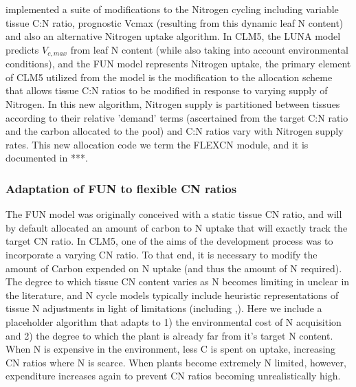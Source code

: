 \documentclass[draft,linenumbers]{agujournal}
\begin{document}
\cite{ghimire2016} implemented a suite of modifications to the Nitrogen cycling including variable tissue C:N ratio, prognostic Vcmax (resulting from this dynamic leaf N content) and also an alternative Nitrogen uptake algorithm. In CLM5, the LUNA model predicts $V_{c,max}$ from leaf N content (while also taking into account environmental conditions), and the FUN model represents Nitrogen uptake, the primary element of CLM5 utilized from the \cite{ghimire2016} model is the modification to the allocation scheme that allows tissue C:N ratios to be modified in response to varying supply of Nitrogen. In this new algorithm, Nitrogen supply is partitioned between tissues according to their relative 'demand' terms (ascertained from the target C:N ratio and the carbon allocated to the pool) and C:N ratios vary with Nitrogen supply rates. This new allocation code we term the FLEXCN module, and it is documented in ***. 

\subsubsection{Adaptation of FUN to flexible CN ratios}
The FUN model was originally conceived with a static tissue CN ratio, and will by default allocated an amount of carbon to N uptake that will exactly track the target CN ratio. In CLM5, one of the aims of the development process was to incorporate a varying CN ratio. To that end, it is necessary to modify the amount of Carbon expended on N uptake (and thus the amount of N required). The degree to which tissue CN content varies as N becomes limiting in unclear in the literature, and N cycle models typically include heuristic representations of tissue N adjustments in light of limitations (including \cite{zaehle2010},\cite{ghimire2016}). Here we include a placeholder algorithm that adapts to 1) the environmental cost of N acquisition and 2) the degree to which the plant is already far from it's target N content. When N is expensive in the environment, less C is spent on uptake, increasing CN ratios where N is scarce. When plants become extremely N limited, however, expenditure increases again to prevent CN ratios becoming unrealistically high.    
\end{document}
